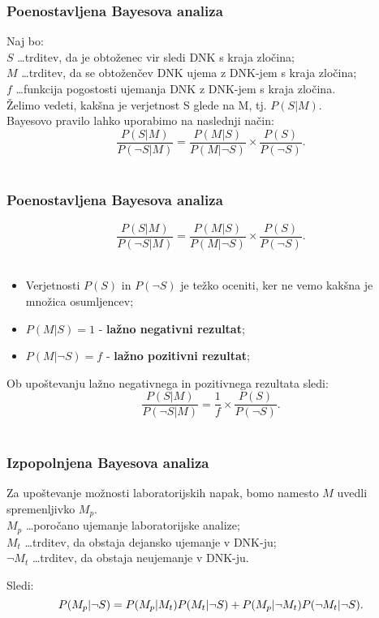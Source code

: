 \documentclass{beamer}
\begin{document}
\begin{frame}
  \frametitle{Poenostavljena Bayesova analiza}
Naj bo:\\
$S$ \dots trditev, da je obtoženec vir sledi DNK s kraja zločina; \\
$M$ \dots trditev, da se obtoženčev DNK ujema z DNK-jem s kraja zločina; \\
$f$ \dots funkcija pogostosti ujemanja DNK z DNK-jem s kraja zločina. \\
Želimo vedeti, kakšna je verjetnost S glede na M, tj. $P(S \lvert M)$. \\ \vspace{3mm}
Bayesovo pravilo lahko uporabimo na naslednji način:
\[\frac{P(S \lvert M)}{P(\neg S \lvert M)} = \frac{P(M \lvert S)}{P(M \lvert \neg S)} \times \frac{P(S)}{P(\neg S)}.\] \\
\end{frame}

\begin{frame}
  \frametitle{Poenostavljena Bayesova analiza}
\[\frac{P(S \lvert M)}{P(\neg S \lvert M)} = \frac{P(M \lvert S)}{P(M \lvert \neg S)} \times \frac{P(S)}{P(\neg S)}.\] \\
\begin{itemize}
  \item Verjetnosti $P(S)$ in $P(\neg S)$ je težko oceniti, ker ne vemo kakšna je množica osumljencev;
  \item $P(M \lvert S) = 1$ - \textbf{lažno negativni rezultat};
  \item $P(M \lvert \neg S) = f$ - \textbf{lažno pozitivni rezultat}; \vspace{3mm}
\end{itemize}
Ob upoštevanju lažno negativnega in pozitivnega rezultata sledi:
  \[\frac{P(S \lvert M)}{P(\neg S \lvert M)} = \frac{1}{f} \times \frac{P(S)}{P(\neg S)}.\] \\  
\end{frame}

\begin{frame}
  \frametitle{Izpopolnjena Bayesova analiza}
Za upoštevanje možnosti laboratorijskih napak, bomo namesto $M$ uvedli spremenljivko $M_p$.\\
$M_p$ \dots poročano ujemanje laboratorijske analize; \\
$M_t$ \dots trditev, da obstaja dejansko ujemanje v DNK-ju;\\
$\neg M_t$ \dots trditev, da obstaja neujemanje v DNK-ju.  \\ \vspace{3mm}

Sledi:
\[P(M_p \lvert \neg S) = P(M_p \lvert M_t)P(M_t \lvert \neg S) + P(M_p \lvert \neg M_t)P(\neg M_t \lvert \neg S). \vspace{3mm}\]
\end{frame}
\end{document}
